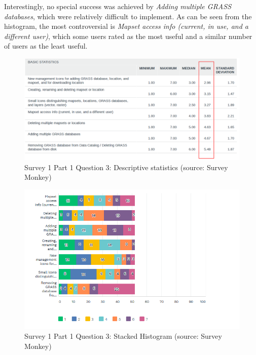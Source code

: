 \documentclass[a4paper,10pt,twoside]{article}
\begin{document}
Interestingly, no special success was achieved by \textit{Adding multiple GRASS databases}, which were relatively difficult to implement. As can be seen from the histogram, the most controversial is \textit{Mapset access info (current, in use, and a different user)}, which some users rated as the most useful and a similar number of users as the least useful.

\vspace{0.3cm}
\begin{figure}[hbt!] 
\begin{center}
\includegraphics[width=17cm]{../surveys/analyzed_data/survey1_part1_question3_descriptive_stats_sm.png} 
\caption[Survey 1 Part 1 Question 3: Descriptive statistics]{Survey 1 Part 1 Question 3: Descriptive statistics (source: Survey Monkey)}
\label{fig:survey1_part1_question3_descriptive_stats_sm}
\end{center}
\end{figure}

\vspace{0.3cm}
\begin{figure}[hbt!] 
\begin{center}
\includegraphics[width=17cm]{../surveys/analyzed_data/survey1_part1_question3_histogram.png} 
\caption[Survey 1 Part 1 Question 3: Stacked Histogram]{Survey 1 Part 1 Question 3: Stacked Histogram (source: Survey Monkey)}
\label{fig:survey1_part1_question3_histogram}
\end{center}
\end{figure}
\end{document}
